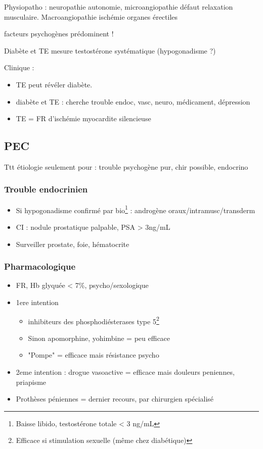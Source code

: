\documentclass{book}
\begin{document}
Physiopatho : neuropathie autonomie, microangiopathie \thus défaut relaxation
musculaire. Macroangiopathie \thus ischémie organes érectiles

\danger facteurs psychogènes prédominent !

Diabète et TE \thus mesure testostérone systématique (hypogonadisme ?)

Clinique : 
\begin{itemize}
\item TE peut révéler diabète.
\item diabète et TE : cherche trouble endoc, vasc, neuro, médicament, dépression
\item TE = FR d'ischémie myocardite silencieuse \danger
\end{itemize}

\subsection{PEC}
\label{sec:orga513924}
Ttt étiologie seulement pour : trouble psychogène pur, chir possible, endocrino

\subsubsection{Trouble endocrinien}
\label{sec:org690f007}
\begin{itemize}
\item Si hypogonadisme confirmé par bio\footnote{Baisse libido, testostérone totale < 3 ng/mL} : androgène oraux/intramusc/transderm
\item CI : nodule prostatique palpable, PSA > 3ng/mL
\item Surveiller prostate, foie, hématocrite
\end{itemize}

\subsubsection{Pharmacologique}
\label{sec:org586d617}
\begin{itemize}
\item FR, Hb glyquée < 7\%, psycho/sexologique
\item 1ere intention 
\begin{itemize}
\item inhibiteurs des phosphodiésterases type 5\footnote{Efficace si stimulation sexuelle (même chez diabétique)}
\item Sinon apomorphine, yohimbine = peu efficace
\item "Pompe" = efficace mais résistance psycho
\end{itemize}
\item 2eme intention : drogue vasoactive = efficace mais douleurs peniennes, priapisme
\item Prothèses péniennes = dernier recours, par chirurgien spécialisé
\end{itemize}
\end{document}
